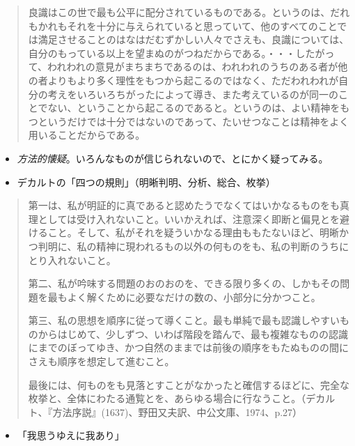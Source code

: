 \documentclass[uplatex,dvipdfmx]{jsarticle}
\begin{document}
\begin{quote}
    良識はこの世で最も公平に配分されているものである。というのは、だれもかれもそれを十分に与えられていると思っていて、他のすべてのことでは満足させることのはなはだむずかしい人々でさえも、良識については、自分のもっている以上を望まぬのがつねだからである。・・・したがって、われわれの意見がまちまちであるのは、われわれのうちのある者が他の者よりもより多く理性をもつから起こるのではなく、ただわれわれが自分の考えをいろいろちがったによって導き、また考えているのが同一のことでない、ということから起こるのであると。というのは、よい精神をもつというだけでは十分ではないのであって、たいせつなことは精神をよく用いることだからである。
  \end{quote}

\begin{itemize}
\item \emph{方法的懐疑}。いろんなものが信じられないので、とにかく疑ってみる。
\item デカルトの「四つの規則」（明晰判明、分析、総合、枚挙）
\end{itemize}

\begin{quotation}
    第一は、私が明証的に真であると認めたうでなくてはいかなるものをも真理としては受け入れないこと。いいかえれば、注意深く即断と偏見とを避けること。そして、私がそれを疑ういかなる理由ももたないほど、明晰かつ判明に、私の精神に現われるもの以外の何ものをも、私の判断のうちにとり入れないこと。

    第二、私が吟味する問題のおのおのを、できる限り多くの、しかもその問題を最もよく解くために必要なだけの数の、小部分に分かつこと。

    第三、私の思想を順序に従って導くこと。最も単純で最も認識しやすいものからはじめて、少しずつ、いわば階段を踏んで、最も複雑なものの認識にまでのぼってゆき、かつ自然のままでは前後の順序をもたぬものの間にさえも順序を想定して進むこと。

    最後には、何ものをも見落とすことがなかったと確信するほどに、完全な枚挙と、全体にわたる通覧とを、あらゆる場合に行なうこと。（デカルト、『方法序説』(1637)、野田又夫訳、中公文庫、1974、p.27）
  \end{quotation}
  
\begin{itemize}
\item 「我思うゆえに我あり」
\end{itemize}



\nocite{中公67:デカルト}
\nocite{塚田富治96:ベイコン}
\end{document}
